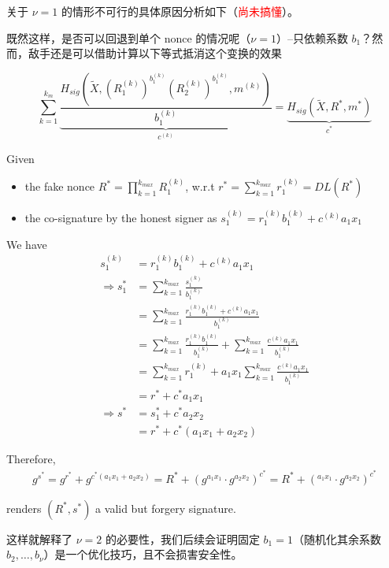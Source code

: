 \documentclass[a4paper,10pt]{article}
\begin{document}
关于 \(\nu=1\) 的情形不可行的具体原因分析如下（\textcolor{red}{尚未搞懂}）。

既然这样，是否可以回退到单个 nonce 的情况呢（\(\nu=1\)）--只依赖系数 \(b_1\)？然而，敌手还是可以借助计算以下等式抵消这个变换的效果

\begin{equation}
  \sum_{k=1}^{k_m} \underbrace{\frac{H_{sig}(\tilde{X},(R_1^{(k)})^{b_1^{(k)}}(R_2^{(k)})^{b_1^{(k)}},m^{(k)})}{b_1^{(k)}}}_{c^{(k)}} = \underbrace{H_{sig}(\tilde{X},R^*,m^*)}_{c^*} 
\end{equation}

Given
\begin{itemize}
  \item the fake nonce \(R^* = \prod_{k=1}^{k_{max}} R_1^{(k)}\), w.r.t \(r^*=\sum_{k=1}^{k_{max}}r_1^{(k)}=DL(R^*)\)
  \item the co-signature by the honest signer as \(s_1^{(k)}=r_1^{(k)}b_1^{(k)}+c^{(k)} a_1 x_1\)
\end{itemize}

We have
\begin{align}
  s_1^{(k)} &= r_1^{(k)}b_1^{(k)}+c^{(k)} a_1 x_1 \\
  \Rightarrow s_1^* &= \sum_{k=1}^{k_{max}} \frac{s_1^{(k)}}{b_1^{(k)}} \\
                    &= \sum_{k=1}^{k_{max}} \frac{r_1^{(k)}b_1^{(k)}+c^{(k)} a_1 x_1}{b_1^{(k)}} \\
                    &= \sum_{k=1}^{k_{max}} \frac{r_1^{(k)}b_1^{(k)}}{b_1^{(k)}} + \sum_{k=1}^{k_{max}} \frac{c^{(k)} a_1 x_1}{b_1^{(k)}} \\
                    &= \sum_{k=1}^{k_{max}} r_1^{(k)} + a_1 x_1 \sum_{k=1}^{k_{max}} \frac{c^{(k)} a_1 x_1}{b_1^{(k)}} \\
                    &= r^* + c^* a_1 x_1 \\
  \Rightarrow s^* &= s_1^* + c^* a_2 x_2 \\
                  &= r^* + c^* (a_1 x_1 + a_2 x_2)
\end{align}

Therefore, 
\begin{align}
  g^{s^*} = g^{r^*} + g^{c^* (a_1 x_1 + a_2 x_2)}
          = R^* + (g^{a_1 x_1}\cdot g^{a_2 x_2})^{c^*}
          = R^* + (^{a_1 x_1}\cdot g^{a_2 x_2})^{c^*}
\end{align}

renders \((R^*,s^*)\) a valid but forgery signature.

这样就解释了 \(\nu=2\) 的必要性，我们后续会证明固定 \(b_1=1\)（随机化其余系数 \(b_2,\dots,b_{\nu}\)）是一个优化技巧，且不会损害安全性。
\end{document}
